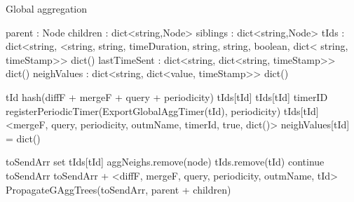 \begin{algorithm}
    \caption{Global aggregation} \label{alg:mon:global_agg}
    \begin{algorithmic}[1]

    \asdstate \label{alg:mon:global_agg:state_start}
        \State parent : Node  
        \State children : dict<string,Node>  
        \State siblings : dict<string,Node>   
        \State tIds : dict<string, <string, string, timeDuration, string, string, boolean, dict< string, timeStamp>> \asdassign dict()
        \State lastTimeSent : dict<string, dict<string, timeStamp>> \asdassign dict()
        \State neighValues : dict<string, dict<value, timeStamp>> \asdassign dict() \label{alg:mon:global_agg:state_end}
    \asdend

    \label{alg:mon:global_agg:start_req}
        \State tId \asdassign hash(diffF + mergeF + query + periodicity) 
            \State <diffF, mergeF, query, periodicity, outmName, timerId, isLocal, aggNeighs> \asdassign tIds[tId]
            \State tIds[tId] \asdassign <mergeF, query, periodicity, outmName, timerId, true, aggNeighs>
        \Else
            \State timerID \asdassign registerPeriodicTimer(ExportGlobalAggTimer(tId), periodicity)
            \State tIds[tId] \asdassign <mergeF, query, periodicity, outmName, timerId, true, dict()>
            \State neighValues[tId] = dict()
            \State
        \EndIf
    \asdend

     \label{alg:mon:global_agg:propag}
        \State toSendArr \asdassign set \label{alg:mon:global_agg:propag_start}
            \State <diffF, mergeF, query, periodicity, outmName, timerId, isLocal, aggNeighs> \asdassign tIds[tId]
                    \State aggNeighs.remove(node)
                \EndIf
            \EndFor
                \State tIds.remove(tId)
                \State continue
            \EndIf
                \State toSendArr \asdassign toSendArr + <diffF, mergeF, query, periodicity, outmName, tId>
            \EndIf
        \EndFor
        \State PropagateGAggTrees(toSendArr, parent + children) \label{alg:mon:global_agg:propag_end}
    \asdend


\end{algorithmic}
\end{algorithm}
